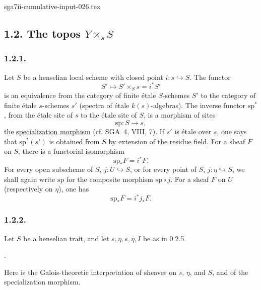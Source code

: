 \begin{filecontents*}{sga7ii-cumulative-input-026.tex}
\subsection*{1.2. The topos $Y\times_s S$}

\subsubsection*{1.2.1.}
Let $S$ be a henselian local scheme with closed point
$i:s\hookrightarrow S$.  The functor
\begin{equation*}
S'\longmapsto S'\times_Ss=i^*S'
\end{equation*}
is an equivalence from the category of finite \'{e}tale $S$-schemes
$S'$ to the category of finite \'{e}tale $s$-schemes $s'$ (spectra of
\'{e}tale $k(s)$-algebras).  The inverse functor $\mathrm{sp}^*$, from
the \'{e}tale site of $s$ to the \'{e}tale site of $S$, is a morphism
of sites
\begin{equation*}
\mathrm{sp}:S\longrightarrow s,
\end{equation*}
the \underline{specialization morphism} (cf. SGA~4, VIII, 7).  If
$s'$ is \'{e}tale over $s$, one says that $\mathrm{sp}^*(s')$ is
obtained from $S$ by \underline{extension of the residue field}.  For
a sheaf $F$ on $S$, there is a functorial isomorphism
\begin{equation}\tag{1.2.1.1}
\mathrm{sp}_*F=i^*F.
\end{equation}
For every open subscheme of $S$, $j:U\hookrightarrow S$, or for every
point of $S$, $j:\eta\hookrightarrow S$, we shall again write
$\mathrm{sp}$ for the composite morphism $\mathrm{sp}\circ j$.  For a
sheaf $F$ on $U$ (respectively on $\eta$), one has
\begin{equation}\tag{1.2.1.2}
\mathrm{sp}_*F=i^*j_*F.
\end{equation}

\subsubsection*{1.2.2.}
Let $S$ be a henselian trait, and let
$s,\eta,\bar s,\bar\eta,I$ be as in 0.2.5.
\begin{center}
.\end{center}
Here is the Galois-theoretic interpretation of sheaves on $s$, $\eta$,
and $S$, and of the specialization morphism.


\end{filecontents*}
